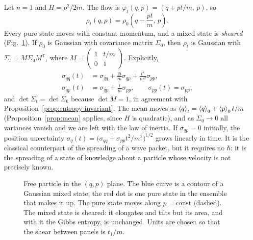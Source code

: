 Let $n=1$ and $H=p^2/2m$. The flow is $\varphi_t(q,p)=(q+pt/m,\,p)$, so
\begin{equation}
\rho_t(q,p)=\rho_0\!\left(q-\frac{pt}{m},\,p\right).
\end{equation}
Every pure state moves with constant momentum, and a mixed state is \emph{sheared} (Fig.~\ref{fig:free}). If $\rho_0$ is Gaussian with covariance matrix $\Sigma_0$, then $\rho_t$ is Gaussian with $\Sigma_t=M\Sigma_0M^{\mathsf T}$, where $M=\begin{pmatrix}1&t/m\\0&1\end{pmatrix}$. Explicitly,
\begin{align}
\sigma_{qq}(t)&=\sigma_{qq}+\frac{2t}{m}\sigma_{qp}+\frac{t^2}{m^2}\sigma_{pp},\\
\sigma_{qp}(t)&=\sigma_{qp}+\frac tm\sigma_{pp},\qquad \sigma_{pp}(t)=\sigma_{pp},
\end{align}
and $\det\Sigma_t=\det\Sigma_0$ because $\det M=1$, in agreement with Proposition~\ref{prop:entropy-invariant}. The mean moves as $\left\langle q\right\rangle_t=\left\langle q\right\rangle_0+\left\langle p\right\rangle_0t/m$ (Proposition~\ref{prop:mean} applies, since $H$ is quadratic), and as $\Sigma_0\to0$ all variances vanish and we are left with the law of inertia. If $\sigma_{qp}=0$ initially, the position uncertainty $\sigma_q(t)=\bigl(\sigma_{qq}+\sigma_{pp}t^2/m^2\bigr)^{1/2}$ grows linearly in time. It is the classical counterpart of the spreading of a wave packet, but it requires no $\hbar$: it is the spreading of a state of knowledge about a particle whose velocity is not precisely known.

\begin{figure}[t]
\centering
{}
\caption{Free particle in the $(q,p)$ plane. The blue curve is a contour of a Gaussian mixed state; the red dot is one pure state in the ensemble that makes it up. The pure state moves along $p=\mathrm{const}$ (dashed). The mixed state is sheared: it elongates and tilts but its area, and with it the Gibbs entropy, is unchanged. Units are chosen so that the shear between panels is $t_1/m$.}
\label{fig:free}
\end{figure}

